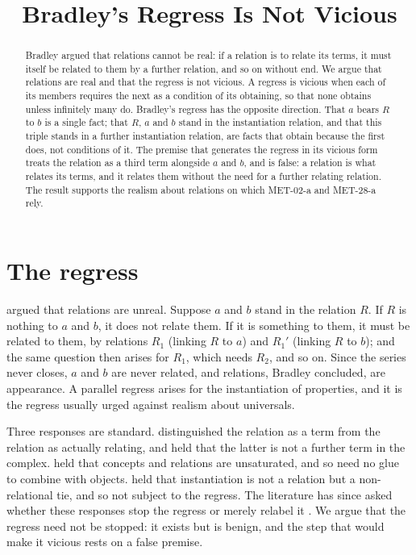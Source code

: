 \documentclass{situationist-preprint}
\title{Bradley's Regress Is Not Vicious}
\begin{document}
\maketitle

\begin{abstract}
Bradley argued that relations cannot be real: if a relation is to relate its terms, it must itself be related to them by a further relation, and so on without end. We argue that relations are real and that the regress is not vicious. A regress is vicious when each of its members requires the next as a condition of its obtaining, so that none obtains unless infinitely many do. Bradley's regress has the opposite direction. That $a$ bears $R$ to $b$ is a single fact; that $R$, $a$ and $b$ stand in the instantiation relation, and that this triple stands in a further instantiation relation, are facts that obtain because the first does, not conditions of it. The premise that generates the regress in its vicious form treats the relation as a third term alongside $a$ and $b$, and is false: a relation is what relates its terms, and it relates them without the need for a further relating relation. The result supports the realism about relations on which MET-02-a and MET-28-a rely.
\end{abstract}

\section{The regress}

\citet[chs.~2--3]{Bradley1893} argued that relations are unreal. Suppose $a$ and $b$ stand in the relation $R$. If $R$ is nothing to $a$ and $b$, it does not relate them. If it is something to them, it must be related to them, by relations $R_1$ (linking $R$ to $a$) and $R_1'$ (linking $R$ to $b$); and the same question then arises for $R_1$, which needs $R_2$, and so on. Since the series never closes, $a$ and $b$ are never related, and relations, Bradley concluded, are appearance. A parallel regress arises for the instantiation of properties, and it is the regress usually urged against realism about universals.

Three responses are standard. \citet[ch.~4]{Russell1903} distinguished the relation as a term from the relation as actually relating, and held that the latter is not a further term in the complex. \citet{Frege1892} held that concepts and relations are unsaturated, and so need no glue to combine with objects. \citet{Armstrong1997} held that instantiation is not a relation but a non-relational tie, and so not subject to the regress. The literature has since asked whether these responses stop the regress or merely relabel it \citep{Gaskin2008,Maurin2012}. We argue that the regress need not be stopped: it exists but is benign, and the step that would make it vicious rests on a false premise.
\end{document}
